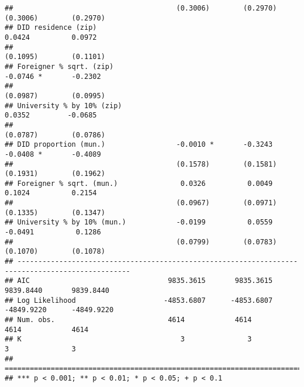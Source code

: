 \documentclass[
]{article}
\begin{document}
\begin{verbatim}
##                                       (0.3006)        (0.2970)        (0.3006)        (0.2970)   
## DID residence (zip)                                                    0.0424          0.0972    
##                                                                       (0.1095)        (0.1101)   
## Foreigner % sqrt. (zip)                                               -0.0746 *       -0.2302    
##                                                                       (0.0987)        (0.0995)   
## University % by 10% (zip)                                              0.0352         -0.0685    
##                                                                       (0.0787)        (0.0786)   
## DID proportion (mun.)                 -0.0010 *       -0.3243         -0.0408 *       -0.4089    
##                                       (0.1578)        (0.1581)        (0.1931)        (0.1962)   
## Foreigner % sqrt. (mun.)               0.0326          0.0049          0.1024          0.2154    
##                                       (0.0967)        (0.0971)        (0.1335)        (0.1347)   
## University % by 10% (mun.)            -0.0199          0.0559         -0.0491          0.1286    
##                                       (0.0799)        (0.0783)        (0.1070)        (0.1078)   
## -------------------------------------------------------------------------------------------------
## AIC                                 9835.3615       9835.3615       9839.8440       9839.8440    
## Log Likelihood                     -4853.6807      -4853.6807      -4849.9220      -4849.9220    
## Num. obs.                           4614            4614            4614            4614         
## K                                      3               3               3               3         
## =================================================================================================
## *** p < 0.001; ** p < 0.01; * p < 0.05; + p < 0.1
\end{verbatim}
\end{document}
